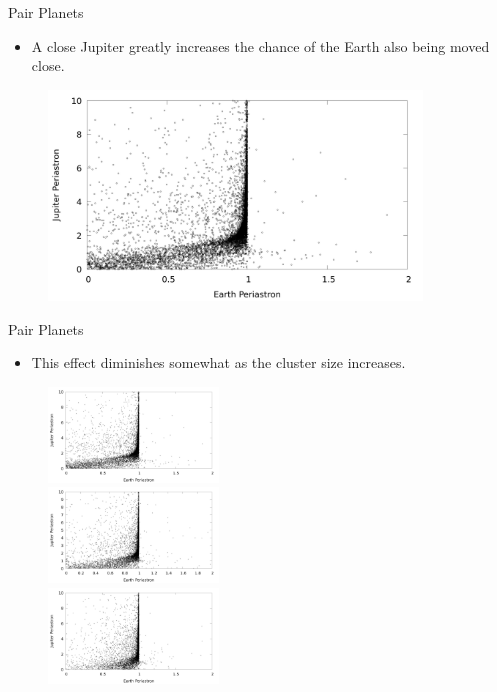 \documentclass{beamer}
\begin{document}
\begin{frame}{Pair Planets}
    \begin{itemize}
        \item A close Jupiter greatly increases the chance of the Earth also being moved close.
    \end{itemize}
    \begin{figure}
        \includegraphics[height=2.20in]{evj_peri_earth_jupiter_1000.png}
    \end{figure}
\end{frame}
\begin{frame}{Pair Planets}
    \begin{itemize}
        \item This effect diminishes somewhat as the cluster size increases.
    \end{itemize}
    \begin{figure}
        \includegraphics[height=1.00in]{evj_peri_earth_jupiter_1000.png} \\
        \includegraphics[height=1.00in]{evj_peri_earth_jupiter_2000.png} \\
        \includegraphics[height=1.00in]{evj_peri_earth_jupiter_4000.png}
    \end{figure}
\end{frame}
\end{document}
